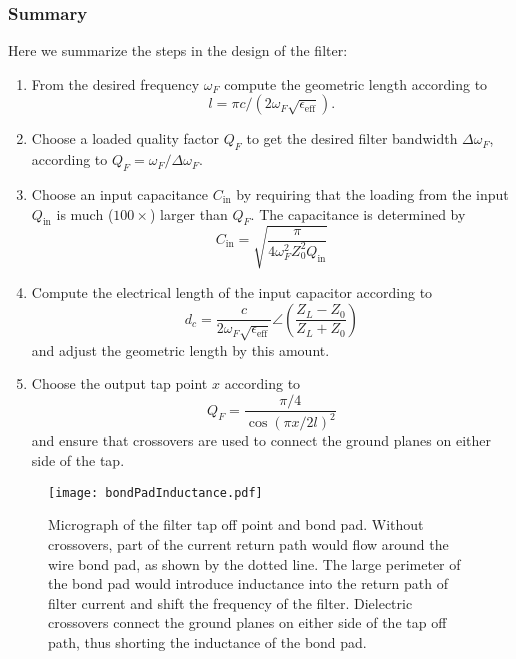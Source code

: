 \subsubsection{Summary}

Here we summarize the steps in the design of the filter:
\begin{enumerate}
 \item From the desired frequency $\omega_F$ compute the geometric length according to \begin{displaymath}
 l = \pi c / (2 \omega_F \sqrt{\epsilon_{\text{eff}}}). \end{displaymath}
 \item Choose a loaded quality factor $Q_F$ to get the desired filter bandwidth $\Delta \omega_F$, according to $Q_F = \omega_F / \Delta \omega_F$.
 \item Choose an input capacitance $C_{\text{in}}$ by requiring that the loading from the input $Q_{\text{in}}$ is much ($100\times$) larger than $Q_F$. The capacitance is determined by \begin{displaymath}
 C_{\text{in}} = \sqrt{\frac{\pi}{4 \omega_F^2 Z_0^2 Q_{\text{in}}}} \end{displaymath}
 \item Compute the electrical length of the input capacitor according to \begin{displaymath}
 d_c = \frac{c}{2\omega_F \sqrt{\epsilon_{\text{eff}}}} \angle \left( \frac{Z_L - Z_0}{Z_L + Z_0} \right) \end{displaymath}
 and adjust the geometric length by this amount.
 \item Choose the output tap point $x$ according to \begin{displaymath}
 Q_F = \frac{\pi / 4}{\cos \left( \pi x / 2 l \right)^2} \end{displaymath}
 and ensure that crossovers are used to connect the ground planes on either side of the tap.
\end{enumerate}

\begin{figure}
\begin{centering}
\texttt{[image: bondPadInductance.pdf]}
\par\end{centering}
\caption{Micrograph of the filter tap off point and bond pad. Without crossovers, part of the current return path would flow around the wire bond pad, as shown by the dotted line. The large perimeter of the bond pad would introduce inductance into the return path of filter current and shift the frequency of the filter. Dielectric crossovers connect the ground planes on either side of the tap off path, thus shorting the inductance of the bond pad.}
\label{Fig:bondPadInductance}
\end{figure}

